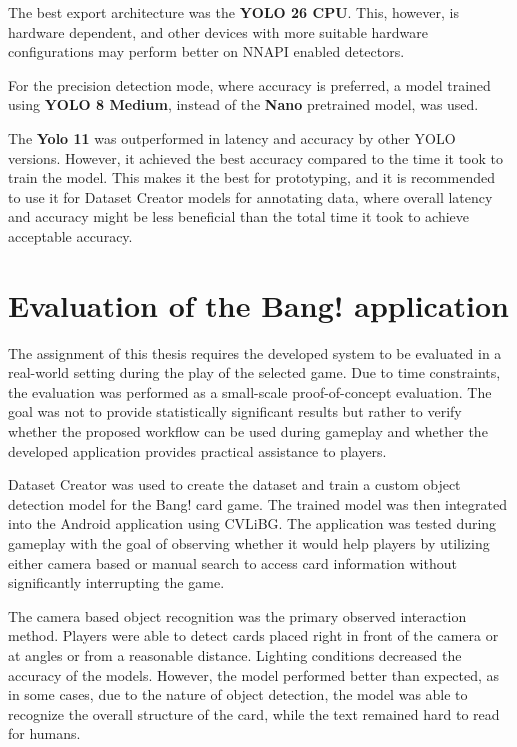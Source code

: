 The best export architecture was the \textbf{YOLO 26 CPU}. This, however, is hardware dependent, and other devices with more suitable hardware configurations may perform better on NNAPI enabled detectors.

For the precision detection mode, where accuracy is preferred, a model trained using \textbf{YOLO 8 Medium}, instead of the \textbf{Nano} pretrained model, was used.

The \textbf{Yolo 11} was outperformed in latency and accuracy by other YOLO versions. However, it achieved the best accuracy compared to the time it took to train the model. This makes it the best for prototyping, and it is recommended to use it for Dataset Creator models for annotating data, where overall latency and accuracy might be less beneficial than the total time it took to achieve acceptable accuracy.


\section{Evaluation of the Bang! application}
\label{bangEvaluation}

The assignment of this thesis requires the developed system to be evaluated in a real-world setting during the play of the selected game. Due to time constraints, the evaluation was performed as a small-scale proof-of-concept evaluation. The goal was not to provide statistically significant results but rather to verify whether the proposed workflow can be used during gameplay and whether the developed application provides practical assistance to players.

Dataset Creator was used to create the dataset and train a custom object detection model for the Bang! card game. The trained model was then integrated into the Android application using CVLiBG. The application was tested during gameplay with the goal of observing whether it would help players by utilizing either camera based or manual search to access card information without significantly interrupting the game.

The camera based object recognition was the primary observed interaction method. Players were able to detect cards placed right in front of the camera or at angles or from a reasonable distance. Lighting conditions decreased the accuracy of the models. However, the model performed better than expected, as in some cases, due to the nature of object detection, the model was able to recognize the overall structure of the card, while the text remained hard to read for humans.

